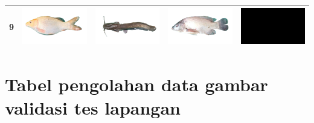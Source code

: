 \begin{longtable}{|c|c|c|c|c|}
    9 & \includegraphics[width=3cm]{gambar/emas/M09} & \includegraphics[width=3cm]{gambar/lele/L09} & \includegraphics[width=3cm]{gambar/nila/N09} & \includegraphics[width=3cm]{gambar/negative_examples/N9} \\
    \hline
\end{longtable}

\chapter{Tabel pengolahan data gambar validasi tes lapangan}


